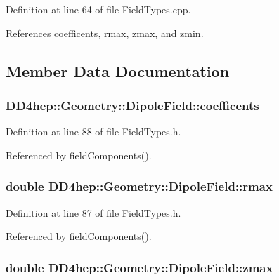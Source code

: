 Definition at line 64 of file FieldTypes.cpp.

References coefficents, rmax, zmax, and zmin.

\subsection{Member Data Documentation}
\hypertarget{class_d_d4hep_1_1_geometry_1_1_dipole_field_ae24ace99bfcc72927cd83cf1aede76a9}{
\subsubsection[{coefficents}]{ {\bf DD4hep::Geometry::DipoleField::coefficents}}}
\label{class_d_d4hep_1_1_geometry_1_1_dipole_field_ae24ace99bfcc72927cd83cf1aede76a9}


Definition at line 88 of file FieldTypes.h.

Referenced by fieldComponents().\hypertarget{class_d_d4hep_1_1_geometry_1_1_dipole_field_a554269ad195ae2b4741fb0df32729168}{
\subsubsection[{rmax}]{\setlength{\rightskip}{0pt plus 5cm}double {\bf DD4hep::Geometry::DipoleField::rmax}}}
\label{class_d_d4hep_1_1_geometry_1_1_dipole_field_a554269ad195ae2b4741fb0df32729168}


Definition at line 87 of file FieldTypes.h.

Referenced by fieldComponents().\hypertarget{class_d_d4hep_1_1_geometry_1_1_dipole_field_acc7b4e9b6fac44800ef4f37f65adaefd}{
\subsubsection[{zmax}]{\setlength{\rightskip}{0pt plus 5cm}double {\bf DD4hep::Geometry::DipoleField::zmax}}}
\label{class_d_d4hep_1_1_geometry_1_1_dipole_field_acc7b4e9b6fac44800ef4f37f65adaefd}


